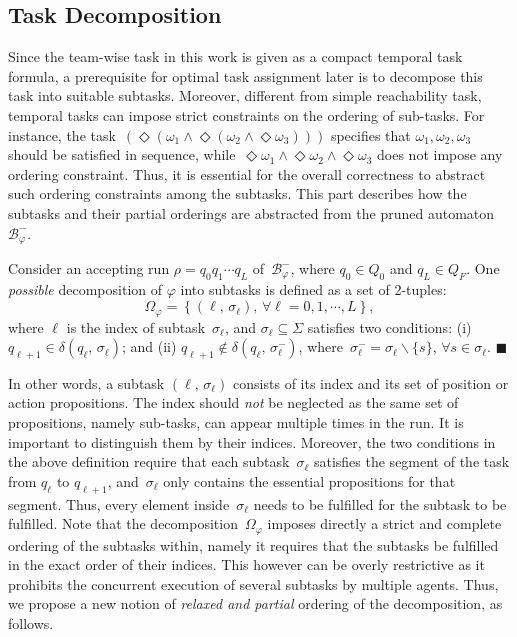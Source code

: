 \subsection{Task Decomposition}\label{subsubsec:task-decompose}
Since the team-wise task in this work is given as a compact temporal task formula,
a prerequisite for optimal task assignment later is to decompose this task into suitable subtasks.
Moreover, different from simple reachability task,
temporal tasks can impose strict constraints on the ordering of sub-tasks.
For instance, the task~$(\Diamond (\omega_1 \land \Diamond (\omega_2 \land \Diamond\omega_3))) $
specifies that $\omega_1,\omega_2,\omega_3$ should be satisfied in sequence,
while~$\Diamond\omega_1\land\Diamond\omega_2\land\Diamond\omega_3$ does not impose any ordering constraint.
Thus, it is essential for the overall correctness to abstract such ordering constraints among the subtasks.
This part describes how the subtasks and their partial orderings are abstracted from the pruned automaton~$\mathcal{B}_{\varphi}^{-}$.

\begin{definition} \label{def:subtasks}
Consider an accepting run $\rho=q_0q_1\cdots q_L$ of~$\mathcal{B}_{\varphi}^{-}$,
where $q_0\in Q_0$ and $q_L\in Q_F$.
One \emph{possible} decomposition of $\varphi$ into subtasks is defined
as a set of 2-tuples:
\begin{equation}\label{eq:subtask}
\Omega_{\varphi} = \left\{(\ell,\, \sigma_\ell),\, \forall \ell=0,1,\cdots,L\right\},
\end{equation}
where $\ell$ is the index of subtask~$\sigma_\ell$,
and $\sigma_\ell\subseteq \Sigma$ satisfies two conditions:
(i) $q_{\ell+1} \in \delta(q_\ell,\,\sigma_\ell)$;
and (ii) $q_{\ell+1} \notin \delta(q_\ell,\,\sigma^-_\ell)$, where~$\sigma^-_\ell =  \sigma_\ell \backslash \{s\}$, $\forall s\in \sigma_\ell$. \hfill $\blacksquare$
\end{definition}

In other words, a subtask $(\ell,\,\sigma_\ell)$ consists of its index and its set of position or action propositions.
The index should \emph{not} be neglected as the same set of propositions, namely sub-tasks,
can appear multiple times in the run.
It is important to distinguish them by their indices.
Moreover, the two conditions in the above definition require that
each subtask~$\sigma_\ell$ satisfies the segment of the task from $q_\ell$ to $q_{\ell+1}$,
and~$\sigma_\ell$ only contains the {essential} propositions for that segment.
Thus, every element inside~$\sigma_\ell$ needs to be fulfilled for the subtask to be fulfilled.
Note that the decomposition~$\Omega_{\varphi}$ imposes directly a {strict and complete} ordering of the subtasks within,
namely it requires that the subtasks be fulfilled in the exact order of their indices.
This however can be overly restrictive as it prohibits the concurrent execution of several subtasks by multiple agents.
Thus, we propose a new notion of \emph{relaxed and partial} ordering of the decomposition,
as follows.

